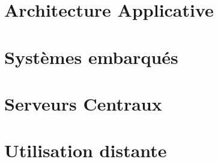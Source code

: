 \section{Architecture Applicative}

\section{Systèmes embarqués}

\section{Serveurs Centraux}

\section{Utilisation distante}
